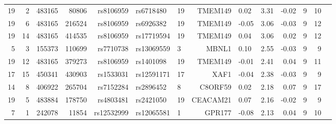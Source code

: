 \documentclass[paper=a4, fontsize=11pt]{scrartcl}	%
\numberwithin{equation}{section}									%
\numberwithin{figure}{section}										%
\numberwithin{table}{section}										%
\begin{document}
\begin{table}[ht]
\begin{tabular}{rrrrrllrlrrrrr}
19 &   2 & 483165 & 80806 & rs8106959 & rs6718480 &  19 & TMEM149 & 0.02 & 3.31 & -0.02 &   9 &  10 \\ 
19 &   6 & 483165 & 216524 & rs8106959 & rs6926382 &  19 & TMEM149 & -0.05 & 3.06 & -0.03 &   9 &  12 \\ 
19 &  14 & 483165 & 414535 & rs8106959 & rs17719594 &  19 & TMEM149 & 0.04 & 3.06 & 0.02 &   9 &  12 \\ 
5 &   3 & 155373 & 110699 & rs7710738 & rs13069559 &   3 & MBNL1 & 0.10 & 2.55 & -0.03 &   9 &   9 \\ 
19 &  12 & 483165 & 379273 & rs8106959 & rs1401098 &  19 & TMEM149 & -0.01 & 2.41 & 0.04 &   9 &  11 \\ 
17 &  15 & 450341 & 430903 & rs1533031 & rs12591171 &  17 & XAF1 & -0.04 & 2.38 & -0.03 &   9 &   9 \\ 
14 &   8 & 406922 & 265704 & rs7152284 & rs2896452 &   8 & C8ORF59 & 0.02 & 2.18 & 0.07 &   9 &  17 \\ 
19 &   5 & 483884 & 178750 & rs4803481 & rs2421050 &  19 & CEACAM21 & 0.07 & 2.16 & -0.02 &   9 &   9 \\ 
7 &   1 & 242078 & 11854 & rs12532999 & rs12065581 &   1 & GPR177 & -0.08 & 2.13 & 0.04 &   9 &  10 \\ 
   \hline
\end{tabular}
\end{table}
\end{document}
